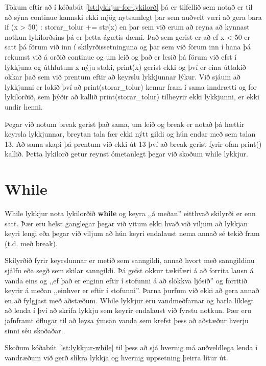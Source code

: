 Tökum eftir að í kóðabút \ref{lst:lykkjur-for-lykilorð} þá er tilfellið sem notað er til að sýna continue kannski ekki mjög nytsamlegt þar sem auðvelt væri að gera bara if (x > 50) : storar\_tolur += str(x) en þar sem við erum að reyna að kynnast notkun lykilorðsins þá er þetta ágætis dæmi.
Það sem gerist er að ef x < 50 er satt þá förum við inn í skilyrðissetninguna og þar sem við förum inn í hana þá rekumst við á orðið continue og um leið og það er lesið þá förum við efst í lykkjuna og úthlutum x nýju staki, print(x) gerist ekki og því er eina úttakið okkar það sem við prentum eftir að keyrslu lykkjunnar lýkur.
Við sjáum að lykkjunni er lokið því að print(storar\_tolur) kemur fram í sama inndrætti og for lykilorðið, sem þýðir að kallið print(storar\_tolur) tilheyrir ekki lykkjunni, er ekki undir henni.

Þegar við notum break gerist það sama, um leið og break er notað þá hættir keyrsla lykkjunnar, breytan tala fær ekki nýtt gildi og hún endar með sem talan 13.
Að sama skapi þá prentum við ekki út 13 því að break gerist fyrir ofan print() kallið.
Þetta lykilorð getur reynst ómetanlegt þegar við skoðum while lykkjur.

\section{While}
While lykkjur nota lykilorðið \textbf{while} og keyra ,,á meðan'' eitthvað skilyrði er enn satt.
Þær eru helst ganglegar þegar við vitum ekki hvað við viljum að lykkjan keyri lengi eða þegar við viljum að hún keyri endalaust nema annað sé tekið fram (t.d. með break).

Skilyrðið fyrir keyrslunnar er metið sem sanngildi, annað hvort með sanngildinu sjálfu eða segð sem skilar sanngildi.
Þá gefst okkur tækifæri á að forrita lausn á vanda eins og ,,ef það er enginn eftir í stofunni á að slökkva ljósið'' og forritið keyrir á meðan ,,einhver er eftir í stofunni''.
Þarna þurfum við ekki að gera annað en að fylgjast með aðstæðum.
While lykkjur eru vandmeðfarnar og harla líklegt að lenda í því að skrifa lykkju sem keyrir endalaust við fyrstu notkun.
Þær eru jafnframt öflugar til að leysa ýmsan vanda sem krefst þess að aðstæður hverju sinni séu skoðaðar.

Skoðum kóðabút \ref{lst:lykkjur-while} til þess að sjá hvernig má auðveldlega lenda í vandræðum við gerð slíkra lykkja og hvernig uppsetning þeirra lítur út.


